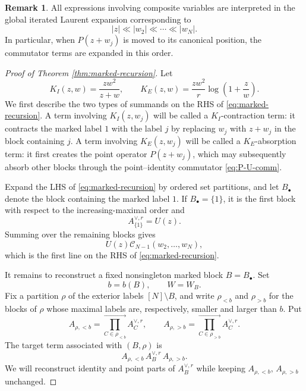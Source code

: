 \documentclass[letterpaper,12pt]{amsart}
\theoremstyle{definition}
\newtheorem{rmk}[thm]{Remark}
\newcommand{\scrC}{\mathscr C}
\numberwithin{equation}{section}
\begin{document}
\begin{rmk}
All expressions involving composite variables are interpreted in the global
iterated Laurent expansion corresponding to
\[
  |z|\ll |w_2|\ll\cdots\ll |w_N|.
\]
In particular, when \(P(z+w_j)\) is moved to its canonical position, the
commutator terms are expanded in this order.
\end{rmk}

\begin{proof}[Proof of Theorem \ref{thm:marked-recursion}]
Let
\begin{equation}
	K_I(z,w)=\frac{zw^2}{z+w},\qquad K_E(z,w)=\frac{zw^2}{r}\log\left(1+\frac zw\right).
	\label{eq:KI-KE}
\end{equation}
We first describe the two types of summands on the RHS of \eqref{eq:marked-recursion}.  A term involving \(K_I(z,w_j)\) will be
called a \(K_I\)-contraction term: it contracts the marked label \(1\) with
the label \(j\) by replacing \(w_j\) with \(z+w_j\) in the block containing
\(j\).  A term involving \(K_E(z,w_j)\) will be called a
\(K_E\)-absorption term: it first creates the point operator
\(P(z+w_j)\), which may subsequently absorb other blocks through the
point--identity commutator \eqref{eq:P-U-comm}.



Expand the LHS of \eqref{eq:marked-recursion} by ordered set partitions, and let \(B_\bullet\)
denote the block containing the marked label \(1\).  If \(B_\bullet=\{1\}\), it is the first block with respect to the increasing-maximal order and
\[
  A_{\{1\}}^{\vee,r}=U(z).
\]
Summing over the remaining blocks gives
\[
  U(z)\scrC_{N-1}(w_2,\ldots,w_N),
\]
which is the first line on the RHS of \eqref{eq:marked-recursion}.

It remains to reconstruct a fixed nonsingleton marked block
\(B=B_\bullet\).  Set
\[
  b=b(B),\qquad W=W_B.
\]
Fix a partition \(\rho\) of the exterior labels \([N]\setminus B\), and
write \(\rho_{<b}\) and \(\rho_{>b}\) for the blocks of \(\rho\) whose maximal
labels are, respectively, smaller and larger than \(b\).  Put
\[
  A_{\rho,<b}
  =
  \overrightarrow{\prod_{C\in\rho_{<b}}}A_C^{\vee,r},
  \qquad
  A_{\rho,>b}
  =
  \overrightarrow{\prod_{C\in\rho_{>b}}}A_C^{\vee,r}.
\]
The target term associated with \((B,\rho)\) is
\begin{equation}\label{eq:target}
  A_{\rho,<b}\,A_B^{\vee,r}\,A_{\rho,>b}.
\end{equation}
We will reconstruct identity and point parts of \(A_B^{\vee,r}\) while keeping $A_{\rho,<b},\,A_{\rho,>b}$ unchanged.


\end{proof}
\end{document}
